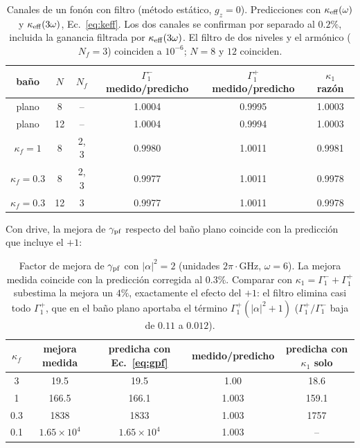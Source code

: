 \documentclass[11pt,a4paper]{article}
\theoremstyle{definition}
\begin{document}
\begin{table}[h]
\centering
\begin{tabular}{cccccc}
\toprule
baño & $N$ & $N_f$ & $\Gamma_1^{-}$ medido/predicho & $\Gamma_1^{+}$ medido/predicho & $\kappa_1$ razón\\
\midrule
plano & 8 & -- & 1.0004 & 0.9995 & 1.0003\\
plano & 12 & -- & 1.0004 & 0.9994 & 1.0003\\
$\kappa_f=1$ & 8 & 2, 3 & 0.9980 & 1.0011 & 0.9981\\
$\kappa_f=0.3$ & 8 & 2, 3 & 0.9977 & 1.0011 & 0.9978\\
$\kappa_f=0.3$ & 12 & 3 & 0.9977 & 1.0011 & 0.9978\\
\bottomrule
\end{tabular}
\caption{Canales de un fonón con filtro (método estático, $g_z=0$). Predicciones con $\kappa_{\rm eff}(\omega)$ y $\kappa_{\rm eff}(3\omega)$, Ec.~\eqref{eq:keff}. Los dos canales se confirman por separado al $0.2\%$, incluida la ganancia filtrada por $\kappa_{\rm eff}(3\omega)$. El filtro de dos niveles y el armónico ($N_f=3$) coinciden a $10^{-6}$; $N=8$ y $12$ coinciden.}
\label{tab:V5}
\end{table}

Con drive, la mejora de $\gamma_{\rm pf}$ respecto del baño plano coincide con la predicción que incluye el $+1$:

\begin{table}[h]
\centering
\begin{tabular}{ccccc}
\toprule
$\kappa_f$ & mejora medida & predicha con Ec.~\eqref{eq:gpf} & medido/predicho & predicha con $\kappa_1$ solo\\
\midrule
3 & 19.5 & 19.5 & 1.00 & 18.6\\
1 & 166.5 & 166.1 & 1.003 & 159.1\\
0.3 & 1838 & 1833 & 1.003 & 1757\\
0.1 & $1.65\times10^{4}$ & $1.65\times10^{4}$ & 1.003 & --\\
\bottomrule
\end{tabular}
\caption{Factor de mejora de $\gamma_{\rm pf}$ con $|\alpha|^2=2$ (unidades $2\pi\cdot$GHz, $\omega=6$). La mejora medida coincide con la predicción corregida al $0.3\%$. Comparar con $\kappa_1=\Gamma_1^{-}+\Gamma_1^{+}$ subestima la mejora un $4\%$, exactamente el efecto del $+1$: el filtro elimina casi todo $\Gamma_1^{+}$, que en el baño plano aportaba el término $\Gamma_1^{+}(|\alpha|^2+1)$ ($\Gamma_1^{+}/\Gamma_1^{-}$ baja de $0.11$ a $0.012$).}
\label{tab:mejora}
\end{table}
\end{document}

